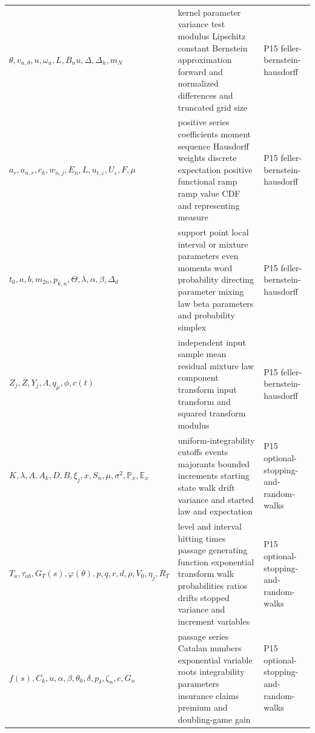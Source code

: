 \begin{longtable}{@{}p{}p{}p{}@{}}
\(\theta,\allowbreak v_{n,\theta},\allowbreak u,\allowbreak \omega_u,\allowbreak L,\allowbreak B_nu,\allowbreak \Delta,\allowbreak \Delta_h,\allowbreak m_N\) & kernel parameter variance test modulus Lipschitz constant Bernstein approximation forward and normalized differences and truncated grid size & P15 feller-\allowbreak{}bernstein-\allowbreak{}hausdorff \\
\(a_r,\allowbreak a_{n,r},\allowbreak c_k,\allowbreak w_{n,j},\allowbreak E_n,\allowbreak L,\allowbreak u_{t,\varepsilon},\allowbreak U_\varepsilon,\allowbreak F,\allowbreak \mu\) & positive series coefficients moment sequence Hausdorff weights discrete expectation positive functional ramp ramp value CDF and representing measure & P15 feller-\allowbreak{}bernstein-\allowbreak{}hausdorff \\
\(t_0,\allowbreak a,\allowbreak b,\allowbreak m_{2n},\allowbreak p_{k,n},\allowbreak \Theta,\allowbreak \lambda,\allowbreak \alpha,\allowbreak \beta,\allowbreak \Delta_d\) & support point local interval or mixture parameters even moments word probability directing parameter mixing law beta parameters and probability simplex & P15 feller-\allowbreak{}bernstein-\allowbreak{}hausdorff \\
\(Z_j,\allowbreak \overline Z,\allowbreak Y_j,\allowbreak \Lambda,\allowbreak q_\mu,\allowbreak \phi,\allowbreak c(t)\) & independent input sample mean residual mixture law component transform input transform and squared transform modulus & P15 feller-\allowbreak{}bernstein-\allowbreak{}hausdorff \\
\(K,\allowbreak \lambda,\allowbreak A,\allowbreak A_k,\allowbreak D,\allowbreak B,\allowbreak \xi_j,\allowbreak x,\allowbreak S_n,\allowbreak \mu,\allowbreak \sigma^2,\allowbreak \mathbb P_x,\allowbreak \mathbb E_x\) & uniform-integrability cutoffs events majorants bounded increments starting state walk drift variance and started law and expectation & P15 optional-\allowbreak{}stopping-\allowbreak{}and-\allowbreak{}random-\allowbreak{}walks \\
\(T_a,\allowbreak \tau_{ab},\allowbreak G_T(s),\allowbreak \varphi(\theta),\allowbreak p,\allowbreak q,\allowbreak r,\allowbreak d,\allowbreak \rho,\allowbreak V_0,\allowbreak \eta_j,\allowbreak R_T\) & level and interval hitting times passage generating function exponential transform walk probabilities ratios drifts stopped variance and increment variables & P15 optional-\allowbreak{}stopping-\allowbreak{}and-\allowbreak{}random-\allowbreak{}walks \\
\(f(s),\allowbreak C_k,\allowbreak u,\allowbreak \alpha,\allowbreak \beta,\allowbreak \theta_0,\allowbreak \delta,\allowbreak p_\delta,\allowbreak \zeta_n,\allowbreak c,\allowbreak G_n\) & passage series Catalan numbers exponential variable roots integrability parameters insurance claims premium and doubling-game gain & P15 optional-\allowbreak{}stopping-\allowbreak{}and-\allowbreak{}random-\allowbreak{}walks \\

\end{longtable}
